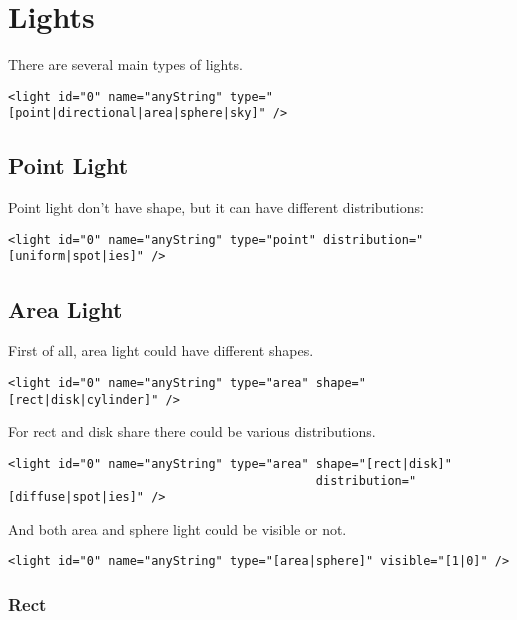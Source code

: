 \documentclass[a4paper,11pt]{report}
\begin{document}
\section{Lights}

There are several main types of lights.

\lstset{language=XML}
\begin{lstlisting}
<light id="0" name="anyString" type="[point|directional|area|sphere|sky]" />
\end{lstlisting}

\subsection{Point Light}

Point light don't have shape, but it can have different distributions:
\lstset{language=XML}
\begin{lstlisting}
<light id="0" name="anyString" type="point" distribution="[uniform|spot|ies]" />
\end{lstlisting}

\subsection{Area Light}

First of all, area light could have different shapes.
\lstset{language=XML}
\begin{lstlisting}
<light id="0" name="anyString" type="area" shape="[rect|disk|cylinder]" />
\end{lstlisting}

For rect and disk share there could be various distributions.

\lstset{language=XML}
\begin{lstlisting}
<light id="0" name="anyString" type="area" shape="[rect|disk]" 
                                           distribution="[diffuse|spot|ies]" />
\end{lstlisting}

And both area and sphere light could be visible or not.
\lstset{language=XML}
\begin{lstlisting}
<light id="0" name="anyString" type="[area|sphere]" visible="[1|0]" />
\end{lstlisting}


\subsubsection{Rect}
\end{document}
